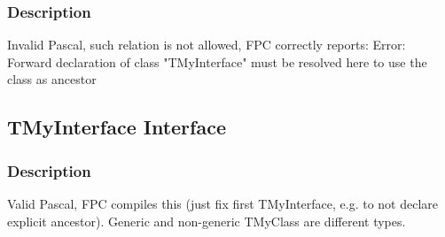 \documentclass{report}
\begin{document}
\subsubsection*{\large{\textbf{Description}}\normalsize\hspace{1ex}\hfill}
Invalid Pascal, such relation is not allowed, FPC correctly reports: Error: Forward declaration of class "TMyInterface" must be resolved here to use the class as ancestor\subsection*{TMyInterface Interface}
\subsubsection*{\large{\textbf{Description}}\normalsize\hspace{1ex}\hfill}
Valid Pascal, FPC compiles this (just fix first TMyInterface, e.g. to not declare explicit ancestor). Generic and non{-}generic TMyClass are different types.
\end{document}
